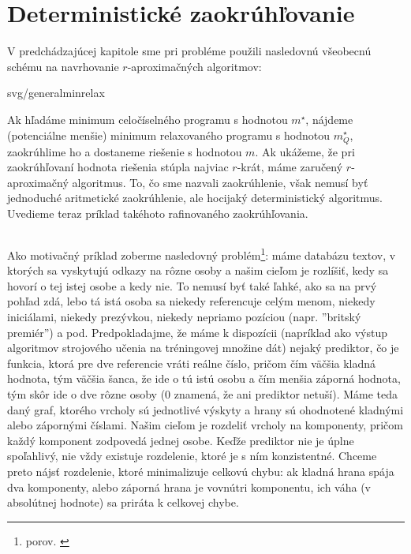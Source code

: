 \section{Deterministické zaokrúhľovanie}

V predchádzajúcej kapitole sme pri probléme \minvcover použili nasledovnú všeobecnú schému
na navrhovanie $r$-aproximačných algoritmov:

\begin{myfig}{0.7\textwidth}{svg/generalminrelax}
\end{myfig}

\noindent
Ak hľadáme minimum celočíselného programu s hodnotou $m^\star$, nájdeme (potenciálne menšie) 
minimum relaxovaného programu s hodnotou $m^\star_Q$, zaokrúhlime ho a dostaneme riešenie s hodnotou $m$.
Ak ukážeme, že pri zaokrúhľovaní hodnota riešenia stúpla najviac $r$-krát, máme zaručený $r$-aproximačný algoritmus.
To, čo sme nazvali zaokrúhlenie, však nemusí byť jednoduché aritmetické zaokrúhlenie, ale hocijaký deterministický
algoritmus. Uvedieme teraz príklad takéhoto rafinovaného zaokrúhľovania.


\subsection*{\minmulticut}

Ako motivačný príklad zoberme nasledovný problém\footnote{porov.
\cite{BBC04,EF03}}: máme databázu textov, v ktorých sa vyskytujú odkazy na
rôzne osoby a našim cieľom je rozlíšiť, kedy sa hovorí o tej istej osobe a kedy
nie. To nemusí byť také ľahké, ako sa na prvý pohľad zdá, lebo tá istá osoba sa
niekedy referencuje celým menom, niekedy iniciálami, niekedy prezývkou, niekedy
nepriamo pozíciou (napr. ''britský premiér'') a pod.  Predpokladajme, že máme k
dispozícii (napríklad ako výstup algoritmov strojového učenia na tréningovej množine dát)  
nejaký prediktor, čo je funkcia, ktorá pre dve referencie vráti
reálne číslo, pričom čím väčšia kladná hodnota, tým väčšia šanca, že ide o tú
istú osobu a čím menšia záporná hodnota, tým skôr ide o dve rôzne osoby (0
znamená, že ani prediktor netuší). Máme teda daný graf, ktorého vrcholy sú jednotlivé výskyty a hrany sú
ohodnotené kladnými alebo zápornými číslami.
Našim cieľom je rozdeliť vrcholy na komponenty, pričom každý komponent zodpovedá jednej osobe. 
Keďže prediktor nie je úplne spoľahlivý, nie vždy existuje rozdelenie, ktoré je s ním konzistentné. Chceme
preto nájsť rozdelenie, ktoré minimalizuje celkovú chybu: ak kladná hrana spája dva komponenty, alebo záporná
hrana je vovnútri komponentu, ich váha (v absolútnej hodnote) sa priráta k celkovej chybe.

